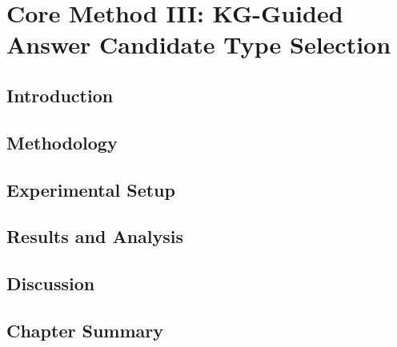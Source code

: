 \chapter{Core Method III: KG-Guided Answer Candidate Type Selection}
\label{ch:type_selection}

\section{Introduction}
\label{sec:typesel:intro}

\section{Methodology}
\label{sec:typesel:method}

\section{Experimental Setup}
\label{sec:typesel:setup}

\section{Results and Analysis}
\label{sec:typesel:results}

\section{Discussion}
\label{sec:typesel:discussion}

\section{Chapter Summary}
\label{sec:typesel:summary}
